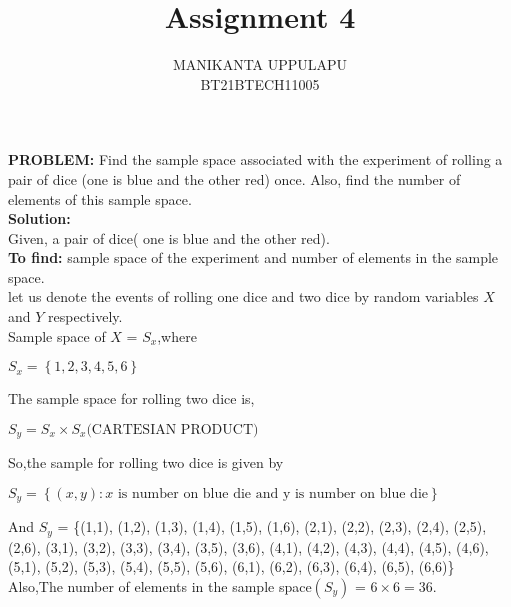 \documentclass[journal,12pt,twocolumn]{IEEEtran}
\title{Assignment 4}
\author{MANIKANTA UPPULAPU\\BT21BTECH11005}
\date{}
\providecommand{\cbrak}[1]{\ensuremath{\left\{#1\right\}}}
\newcommand{\PROBLEM}{\noindent \textbf{PROBLEM: }}
\newcommand{\solution}{\noindent \textbf{Solution: }}
\newcommand{\tofind}{\noindent \textbf{To find: }}
\begin{document}
\maketitle
\PROBLEM Find the sample space associated with the experiment of rolling a pair of dice (one is blue and the other red) once. Also, find the number of elements of this sample space.\\

\solution \\
Given, a pair of dice( one is blue and the other red).\\

\tofind sample space of the experiment and number of elements in the sample space.\\

let us denote the events of rolling one dice and two dice by random variables $X$ and $Y$ respectively.\\
Sample space of $X$ = $S_x$,where\\
\begin{enumerate}[label=(\roman{enumi})]
	$S_x = \cbrak{1,2,3,4,5,6}$\\
\end{enumerate}
The sample space for rolling two dice is,\\
\begin{enumerate}[label=(\roman{enumi})]
	$S_y = S_x \times S_x \text{(CARTESIAN PRODUCT)}$
\end{enumerate}
So,the sample for rolling two dice is given by\\
\begin{enumerate}[label=(\roman{enumi})]
$S_y = \cbrak {(x,y) : x \text{ is number on blue die and y is number on blue die} }$\\
\end{enumerate}
And $S_y$ = \{(1,1), (1,2), (1,3), (1,4), (1,5), (1,6), (2,1), (2,2), (2,3), (2,4), (2,5), (2,6), (3,1), (3,2), (3,3), (3,4), (3,5), (3,6), (4,1), (4,2), (4,3), (4,4), (4,5), (4,6), (5,1), (5,2), (5,3), (5,4), (5,5), (5,6), (6,1), (6,2), (6,3), (6,4), (6,5), (6,6)\}\\

Also,The number of elements in the sample space$(S_y)$ = $6 \times 6 = 36.$
\end{document}
